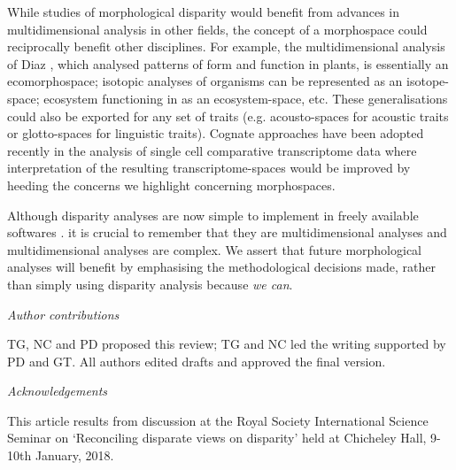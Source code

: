 \documentclass[12pt,letterpaper]{article}
\renewcommand{\subsection}[1]{%
\bigskip
\begin{center}
\begin{large}
\normalfont\itshape #1
\end{large}
\end{center}}
\begin{document}
While studies of morphological disparity would benefit from advances in multidimensional analysis in other fields, the concept of a morphospace could reciprocally benefit other disciplines.
For example, the multidimensional analysis of Diaz \citealt{Diaz2016-mr}, which analysed patterns of form and function in plants, is essentially an ecomorphospace; isotopic analyses of organisms \citep{Jackson2011-kq} can be represented as an isotope-space; ecosystem functioning in \citealt{Donohue2013-bg} as an ecosystem-space, etc.
These generalisations could also be exported for any set of traits (e.g. acousto-spaces for acoustic traits or glotto-spaces for linguistic traits).
Cognate approaches have been adopted recently in the analysis of single cell comparative transcriptome data \citep{Sebe-Pedros2018-sw} where interpretation of the resulting transcriptome-spaces would be improved by heeding the concerns we highlight concerning morphospaces.

Although disparity analyses are now simple to implement in freely available softwares \citep{Navarro2003-vz, Bouxin2005-wk, oksanen2007vegan, Harmon2008-gq, lloyd2016, Guillerme2018-uc}.
it is crucial to remember that they are multidimensional analyses and multidimensional analyses are complex.
We assert that future morphological analyses will benefit by emphasising the methodological decisions made, rather than simply using disparity analysis because \textit{we can}.

\subsection{Author contributions}

TG, NC and PD proposed this review; TG and NC led the writing supported by PD and GT. All authors edited drafts and approved the final version.

\subsection{Acknowledgements}

This article results from discussion at the Royal Society International Science Seminar on `Reconciling disparate views on disparity' held at Chicheley Hall, 9-10th January, 2018.
\end{document}
